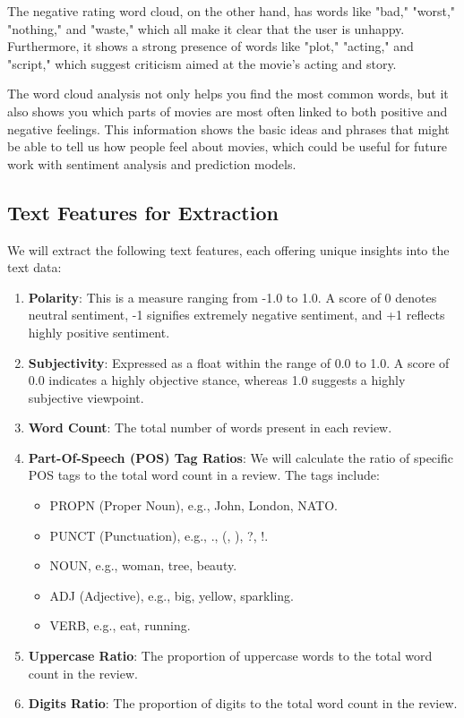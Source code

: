 \documentclass[11pt,a4paper]{article}
\begin{document}
The negative rating word cloud, on the other hand, has words like "bad," "worst," "nothing," and "waste," which all make it clear that the user is unhappy. Furthermore, it shows a strong presence of words like "plot," "acting," and "script," which suggest criticism aimed at the movie's acting and story.

The word cloud analysis not only helps you find the most common words, but it also shows you which parts of movies are most often linked to both positive and negative feelings. This information shows the basic ideas and phrases that might be able to tell us how people feel about movies, which could be useful for future work with sentiment analysis and prediction models.





\subsection{Text Features for Extraction}

We will extract the following text features, each offering unique insights into the text data:

\begin{enumerate}
    \item \textbf{Polarity}: This is a measure ranging from -1.0 to 1.0. A score of 0 denotes neutral sentiment, -1 signifies extremely negative sentiment, and +1 reflects highly positive sentiment.
    \item \textbf{Subjectivity}: Expressed as a float within the range of 0.0 to 1.0. A score of 0.0 indicates a highly objective stance, whereas 1.0 suggests a highly subjective viewpoint.
    \item \textbf{Word Count}: The total number of words present in each review.
    \item \textbf{Part-Of-Speech (POS) Tag Ratios}: We will calculate the ratio of specific POS tags to the total word count in a review. The tags include:
    \begin{itemize}
        \item PROPN (Proper Noun), e.g., John, London, NATO.
        \item PUNCT (Punctuation), e.g., ., (, ), ?, !.
        \item NOUN, e.g., woman, tree, beauty.
        \item ADJ (Adjective), e.g., big, yellow, sparkling.
        \item VERB, e.g., eat, running.
    \end{itemize}
    \item \textbf{Uppercase Ratio}: The proportion of uppercase words to the total word count in the review.
    \item \textbf{Digits Ratio}: The proportion of digits to the total word count in the review.
\end{enumerate}
\end{document}
